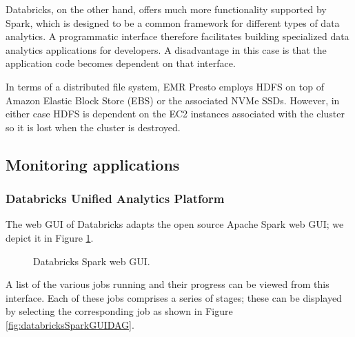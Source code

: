Databricks, on the other hand, offers much more functionality supported by Spark, which is designed to be a common framework for different types of data analytics. A programmatic interface therefore facilitates building specialized data analytics applications for developers. A disadvantage in this case is that the application code becomes dependent on that interface.

In terms of a distributed file system, EMR Presto employs HDFS on top of Amazon Elastic Block Store (EBS) or the associated NVMe SSDs. However, in either case HDFS is dependent on the EC2 instances associated with the cluster so it is lost when the cluster is destroyed.

\subsection{Monitoring applications}

\subsubsection{Databricks Unified Analytics Platform}

The web GUI of Databricks adapts the open source Apache Spark web GUI; we depict it in Figure \ref{fig:databricksSparkGUI}.

\begin{figure}
   \begin{center}
   \end{center}
   \caption{Databricks Spark web GUI.}
   \label{fig:databricksSparkGUI}
\end{figure}

A list of the various jobs running and their progress can be viewed from this interface. Each of these jobs comprises a series of stages; these can be displayed by selecting the corresponding job as shown in Figure \ref{fig:databricksSparkGUIDAG}.

